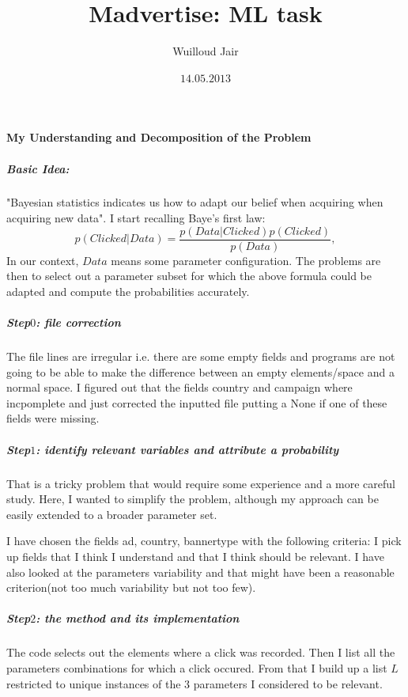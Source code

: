 \documentclass{report}
\begin{document}
\title{Madvertise: ML task}
\author{Wuilloud Jair}
\date{$14.05.2013$}
\maketitle




\pagebreak

\paragraph{My Understanding and Decomposition of the Problem}

\subparagraph{ Basic Idea: }
"Bayesian statistics indicates us how to adapt our belief when acquiring when acquiring new data".
I start recalling Baye's first law:
$$
p(Clicked | Data) = \frac{p(Data | Clicked)p(Clicked)}{p(Data)},
$$
In our context, $Data$ means some parameter configuration. 
The problems are then to select out a parameter subset for which the 
above formula could be adapted and compute the probabilities accurately. 

\subparagraph{Step$0$: file correction}
The file lines are irregular i.e. there are some empty fields and programs are not going to be able to make the difference
between an empty elements/space and a normal space.
 I figured out that the fields country and campaign 
where incpomplete and just corrected the inputted file putting a None if one of these fields were missing.

\subparagraph{Step$1$: identify relevant variables and attribute a probability}
That is a tricky problem that would require some experience and a more careful study.
Here, I wanted to simplify the problem, although my approach can be easily extended to a broader parameter set.

I have chosen the fields ad, country, bannertype with the following criteria: %
 I pick up fields that I think I understand and that I think should be relevant. 
I have also looked at the parameters variability and that might have been a reasonable criterion(not too much variability but not too few).


\subparagraph{Step$2$: the method and its implementation}
The code selects out the elements where a click was recorded. 
Then I list all the parameters combinations for which a click occured.
From that I  build up a list $L$ restricted to unique instances of the $3$ parameters I considered to be relevant. 
\end{document}
